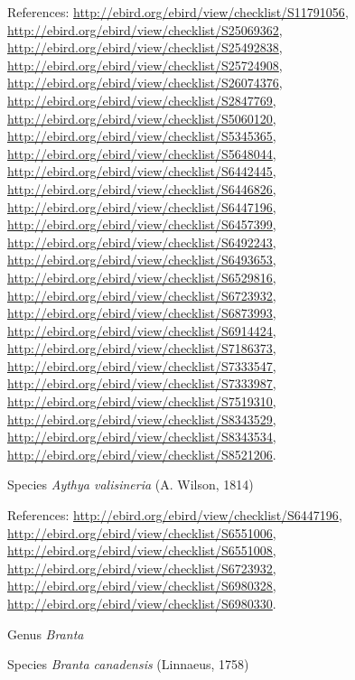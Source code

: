 \documentclass[9pt, article]{memoir}
\begin{document}
\begin{multicols}{2}
\vspace{6pt}References: 
\url{http://ebird.org/ebird/view/checklist/S11791056}, 
\url{http://ebird.org/ebird/view/checklist/S25069362}, 
\url{http://ebird.org/ebird/view/checklist/S25492838}, 
\url{http://ebird.org/ebird/view/checklist/S25724908}, 
\url{http://ebird.org/ebird/view/checklist/S26074376}, 
\url{http://ebird.org/ebird/view/checklist/S2847769}, 
\url{http://ebird.org/ebird/view/checklist/S5060120}, 
\url{http://ebird.org/ebird/view/checklist/S5345365}, 
\url{http://ebird.org/ebird/view/checklist/S5648044}, 
\url{http://ebird.org/ebird/view/checklist/S6442445}, 
\url{http://ebird.org/ebird/view/checklist/S6446826}, 
\url{http://ebird.org/ebird/view/checklist/S6447196}, 
\url{http://ebird.org/ebird/view/checklist/S6457399}, 
\url{http://ebird.org/ebird/view/checklist/S6492243}, 
\url{http://ebird.org/ebird/view/checklist/S6493653}, 
\url{http://ebird.org/ebird/view/checklist/S6529816}, 
\url{http://ebird.org/ebird/view/checklist/S6723932}, 
\url{http://ebird.org/ebird/view/checklist/S6873993}, 
\url{http://ebird.org/ebird/view/checklist/S6914424}, 
\url{http://ebird.org/ebird/view/checklist/S7186373}, 
\url{http://ebird.org/ebird/view/checklist/S7333547}, 
\url{http://ebird.org/ebird/view/checklist/S7333987}, 
\url{http://ebird.org/ebird/view/checklist/S7519310}, 
\url{http://ebird.org/ebird/view/checklist/S8343529}, 
\url{http://ebird.org/ebird/view/checklist/S8343534}, 
\url{http://ebird.org/ebird/view/checklist/S8521206}.

\vspace{6pt}\noindent\hspace{36pt}Species \textit{Aythya valisineria} (A. Wilson, 1814)


\vspace{6pt}References: 
\url{http://ebird.org/ebird/view/checklist/S6447196}, 
\url{http://ebird.org/ebird/view/checklist/S6551006}, 
\url{http://ebird.org/ebird/view/checklist/S6551008}, 
\url{http://ebird.org/ebird/view/checklist/S6723932}, 
\url{http://ebird.org/ebird/view/checklist/S6980328}, 
\url{http://ebird.org/ebird/view/checklist/S6980330}.

\vspace{6pt}\noindent\hspace{30pt}Genus \textit{Branta}


\vspace{6pt}\noindent\hspace{36pt}Species \textit{Branta canadensis} (Linnaeus, 1758)



\end{multicols}
\end{document}
